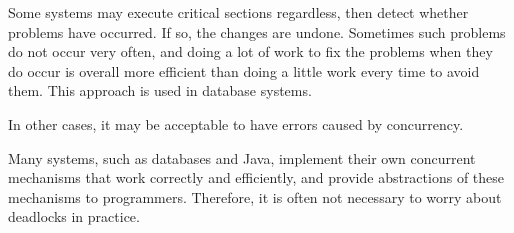 Some systems may execute critical sections regardless, then detect whether problems have occurred.
If so, the changes are undone.
Sometimes such problems do not occur very often, and doing a lot of work to fix the problems when they do occur is overall more efficient than doing a little work every time to avoid them.
This approach is used in database systems.

In other cases, it may be acceptable to have errors caused by concurrency.

Many systems, such as databases and Java, implement their own concurrent mechanisms that work correctly and efficiently, and provide abstractions of these mechanisms to programmers.
Therefore, it is often not necessary to worry about deadlocks in practice.
